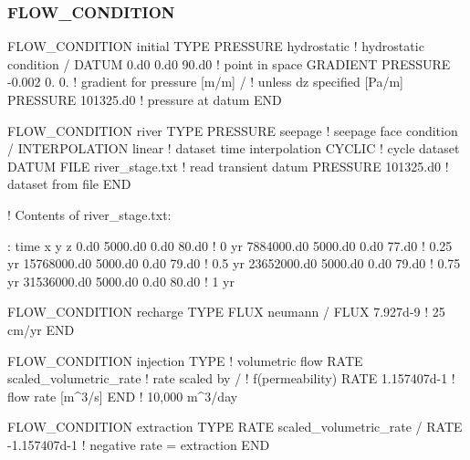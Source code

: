 \documentclass{beamer}
\newcommand\redcomment[1]{{{\color{red} #1}}}
\newcommand\bluecomment[1]{{{\color{blue} #1}}}
\begin{document}
\begin{frame}\frametitle{FLOW\_CONDITION}

\begin{semiverbatim}

FLOW_CONDITION initial
  TYPE
    PRESSURE hydrostatic  \bluecomment{! hydrostatic condition}
  /
  DATUM 0.d0 0.d0 90.d0   \bluecomment{! point in space}
  GRADIENT
    PRESSURE -0.002 0. 0. \bluecomment{! gradient for pressure \redcomment{[m/m]}}
  /                       \bluecomment{!   unless \redcomment{dz} specified \redcomment{[Pa/m]}}
  PRESSURE 101325.d0      \bluecomment{! pressure at datum}
END

\newpage

FLOW_CONDITION river
  TYPE
    PRESSURE seepage     \bluecomment{! seepage face condition}
  /
  INTERPOLATION linear   \bluecomment{! dataset time interpolation}
  CYCLIC                 \bluecomment{! cycle dataset}
  DATUM FILE river_stage.txt  \bluecomment{! read transient datum}
  PRESSURE 101325.d0          \bluecomment{!    dataset from file}
END

\newpage

\bluecomment{! Contents of river_stage.txt:}

\bluecomment{: time x y z}
0.d0 5000.d0 0.d0 80.d0          \bluecomment{! 0 yr}
7884000.d0 5000.d0 0.d0 77.d0    \bluecomment{! 0.25 yr}
15768000.d0 5000.d0 0.d0 79.d0   \bluecomment{! 0.5 yr}
23652000.d0 5000.d0 0.d0 79.d0   \bluecomment{! 0.75 yr}
31536000.d0 5000.d0 0.d0 80.d0   \bluecomment{! 1 yr}

\newpage

FLOW_CONDITION recharge
  TYPE
    FLUX neumann
  /
  FLUX 7.927d-9  \bluecomment{! 25 cm/yr}
END

\newpage
FLOW_CONDITION injection
  TYPE                           \bluecomment{! volumetric flow}
    RATE scaled_volumetric_rate  \bluecomment{!   rate scaled by}
  /                              \bluecomment{!   f(permeability)}
  RATE 1.157407d-1  \bluecomment{! flow rate [m^3/s]}
END                 \bluecomment{!   10,000 m^3/day}

FLOW_CONDITION extraction
  TYPE
    RATE scaled_volumetric_rate
  /
  RATE -1.157407d-1 \bluecomment{! negative rate = extraction}
END


\end{semiverbatim}
\end{frame}

\end{document}
